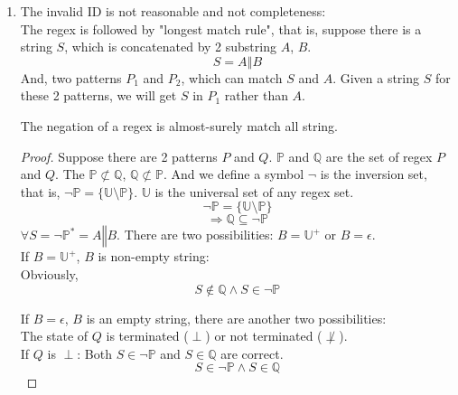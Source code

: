 \documentclass[12pt,a4paper]{article}
\newenvironment{claim}[1]{\par\noindent{Claim:}\space#1}{}
\begin{document}
\begin{CJK}{UTF8}{bsmi}
\begin{enumerate}
        \item The invalid ID is not reasonable and not completeness:\\
              The regex is followed by "longest match rule", that is, suppose there is a string $S$,
              which is concatenated by 2 substring $A$, $B$.  $$S = A \mathbin\Vert B$$
              And, two patterns $P_1$ and $P_2$, which can match $S$ and $A$. Given a
              string $S$ for these 2 patterns, we will get $S$ in $P_1$ rather than $A$.\\
              \begin{claim}
                  The negation of a regex is almost-surely match all string.
              \end{claim}
              \begin{proof}
                  Suppose there are 2 patterns $P$ and $Q$. $\mathbb{P}$ and $\mathbb{Q}$ are the
                  set of regex $P$ and $Q$. The $\mathbb{P} \not\subset \mathbb{Q}$,
                  $\mathbb{Q} \not\subset \mathbb{P}$.
                  And we define a symbol $\neg$ is the inversion set, that is, $\neg \mathbb{P} = \{\mathbb{U}
                      \setminus \mathbb{P}\}$. $\mathbb{U}$ is the universal set of any regex set.\\
                  $$\neg \mathbb{P} = \{\mathbb{U} \setminus \mathbb{P}\}$$
                  $$\Rightarrow \mathbb{Q} \subseteq \neg \mathbb{P}$$
                  $\forall S = {\neg \mathbb{P}}^* = A \mathbin\Vert B$. There are two possibilities:
                  $B = \mathbb{U}^+$ or $B = \epsilon$.\\
                  If $B = \mathbb{U}^+$, $B$ is non-empty string:\\
                  Obviously,
                  \begin{equation}
                      S \not\in \mathbb{Q} \land S \in \neg\mathbb{P}
                  \end{equation}

                  If $B = \epsilon$, $B$ is an empty string, there are another two possibilities:\\
                  The state of $Q$ is terminated ($\perp$) or not terminated ($\not\perp$).\\
                  If $Q$ is $\perp$:
                  Both $S \in \neg \mathbb{P}$ and $S \in \mathbb{Q}$ are correct.
                  \begin{equation}
                      S \in \neg \mathbb{P} \land S \in \mathbb{Q}
                  \end{equation}


\end{proof}
\end{enumerate}
\end{CJK}
\end{document}
